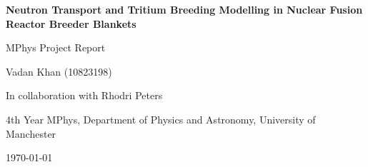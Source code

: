 \documentclass[12pt]{article}
\begin{document}
\begin{titlepage}
    \centering %

    \vspace*{2cm} %

    {\Large \bfseries Neutron Transport and Tritium Breeding Modelling in Nuclear Fusion Reactor
    Breeder Blankets \par}
    \vspace{0.5em}
    {\normalsize MPhys Project Report \par}

    \vspace{3em} %

    {\large Vadan Khan (10823198)\par}
    {In collaboration with Rhodri Peters \par}
    \vspace{0.5em}
    {4th Year MPhys, Department of Physics and Astronomy, University of Manchester \par}

    \vspace{2em} %

    {\large \today \par}

    \vfill %

    \begin{minipage}{1\textwidth}
    \begin{abstract}
    The realisation of commercial nuclear fusion via the deuterium-tritium (D-T) fuel cycle is
    contingent upon achieving tritium self-sufficiency. This project utilises a coupled
    computational workflow, integrating Paramak for parametric CAD generation and OpenMC for
    stochastic neutron transport, to optimise the neutronic performance of tokamak breeder blankets.
    A systematic parameter sweep was conducted to evaluate the impact of material composition,
    isotopic enrichment, and reactor geometry on the Tritium Breeding Ratio (TBR).


\end{abstract}
\end{minipage}
\end{titlepage}
\end{document}
